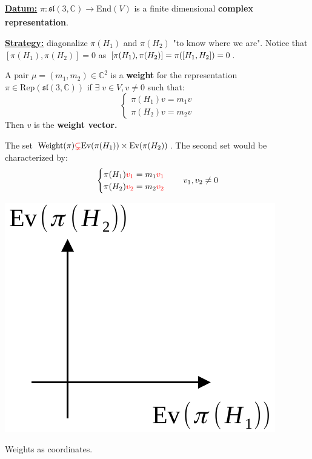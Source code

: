 \documentclass[../main.tex]{subfiles}
\begin{document}
\underline{\textbf{Datum:}} $\pi:\mathfrak{sl}(3,\mathbb{C})\xrightarrow[]{}$End$(V)$ is a finite dimensional \textbf{complex representation}.

\underline{\textbf{Strategy:}} diagonalize $\pi(H_1)$ and $\pi(H_2)$ "to know where we are". Notice that $[\pi(H_1),\pi(H_2)]=0$ as $[\pi(H_1),\pi(H_2)]=\pi(\comm{H_1}{H_2})=0$.
\begin{definition}
A pair $\mu=(m_1,m_2)\in\mathbb{C}^2$ is a \textbf{weight} for the representation $\pi\in\textrm{Rep}(\mathfrak{sl}(3,\mathbb{C}))$ if $\exists\; v\in V, v\neq0$ such that:
\[
\begin{cases}
\pi(H_1)v=m_1v\\
\pi(H_2)v=m_2v
\end{cases}
\]
Then $v$ is the \textbf{weight vector.}
\end{definition}
\begin{kaobox}[frametitle=Remark]
The set $\textrm{Weight}(\pi){\color{red}\subsetneq}\textrm{Ev}(\pi(H_1))\times\textrm{Ev}(\pi(H_2))$. The second set would be characterized by:
\[
\begin{cases}
\pi(H_1){\color{red}v_1}=m_1{\color{red}v_1}\\
\pi(H_2){\color{red}v_2}=m_2{\color{red}v_2}
\end{cases}
\quad v_1,v_2\neq0
\]
\end{kaobox}
\begin{marginfigure}[-30mm]
	\includegraphics[width=1\linewidth]{images/weights_as_coord.pdf}
	\caption[Weights as coordinates]{Weights as coordinates.}
\end{marginfigure}
\end{document}
